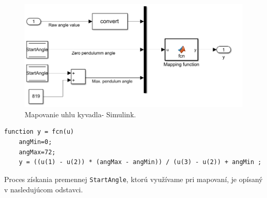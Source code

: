 \begin{figure}[!tbh]
	\centering
	\includegraphics[width=\textwidth]{obr/SensMap.png}
	\caption{Mapovanie uhlu kyvadla- Simulink.}\label{OBRAZOK 2.6.7}
\end{figure}


\begin{lstlisting}[caption={Mapovacia funkcia vo fcn bloku.},captionpos=b,label=MAPfcn]
	function y = fcn(u)
	angMin=0;
	angMax=72;
	y = ((u(1) - u(2)) * (angMax - angMin)) / (u(3) - u(2)) + angMin ;
\end{lstlisting}


Proces získania premennej \verb|StartAngle|, ktorú využívame pri mapovaní, je opísaný v nasledujúcom odstavci. 

